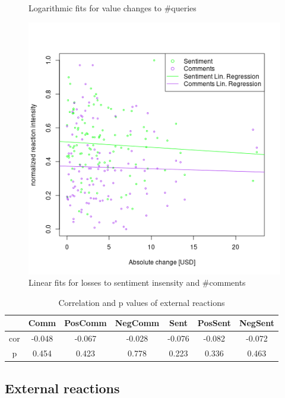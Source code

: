 \documentclass[12pt]{article}
\begin{document}
\begin{figure}[!]
  \caption{Logarithmic fits for value changes to \#queries}\label{fig:logTrendRegressions}
\endminipage\hfill
{}
  \includegraphics[width=\linewidth]{externalReactionsLosses.png}
  \caption{Linear fits for losses to sentiment insensity and \#comments}\label{fig:linExternalLosses}
\endminipage\hfill
\end{figure}

\begin{table}[h!]
\centering
\begin{tabular}{|| c ||c c c c c c||} 
 \hline
 & Comm & PosComm & NegComm & Sent & PosSent & NegSent \\ [0.5ex] 
 \hline\hline
 cor & -0.048 & -0.067 & -0.028 & -0.076 & -0.082 & -0.072\\ 
 p & 0.454 & 0.423 & 0.778 & 0.223 & 0.336 & 0.463\\
 \hline
\end{tabular}
\caption{Correlation and p values of external reactions}
\label{table:externalReactions}
\end{table}

\subsection{External reactions}
\end{document}
